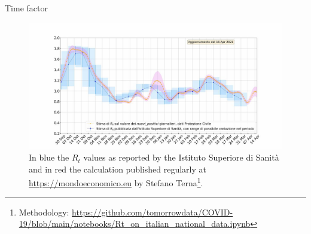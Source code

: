 \documentclass[8pt]{beamer}
\begin{document}
\begin{frame}{Time factor}

\begin{figure}[H]
\center
\includegraphics[scale=0.19]{RtEstimation2.jpg}
\caption{In blue the $R_t$ values as reported by the Istituto Superiore di Sanit\`{a} and in red the calculation published regularly at \url{https://mondoeconomico.eu} by Stefano Terna\footnote{Methodology: \url{https://github.com/tomorrowdata/COVID-19/blob/main/notebooks/Rt_on_italian_national_data.ipynb}}.}
\label{Rt}
\end{figure}


\end{frame}
\end{document}
